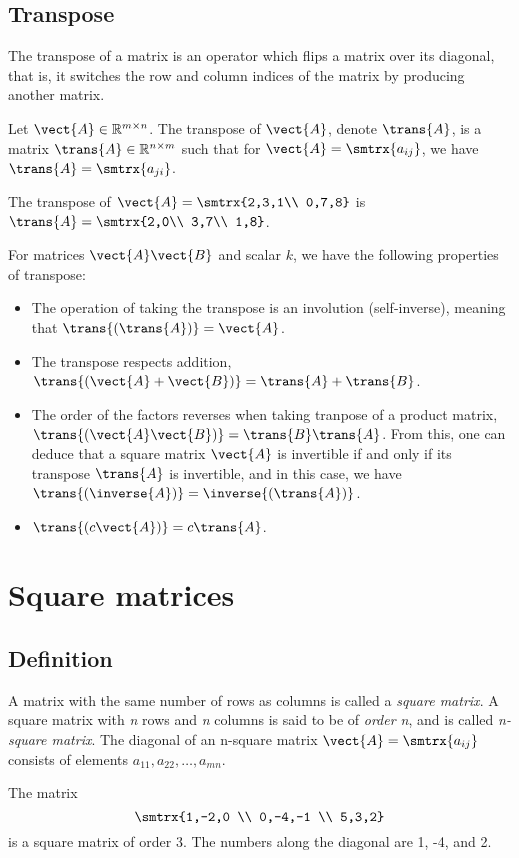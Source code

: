 \subsection{Transpose}
The transpose of a matrix is an operator which flips a matrix over its diagonal, that is, it switches the row and column indices of the matrix by producing another matrix.\par 
Let $\vect{A}\in \mathbb{R}^{m\times n}$. The transpose of $\vect{A}$, denote $\trans{A}$, is a matrix $\trans{A}\in \mathbb{R}^{n\times m}$ such that for $\vect{A}=\smtrx{a_{ij}}$, we have $\trans{A}=\smtrx{a_{ji}}$.\par 
\begin{example}
    The transpose of $\vect{A}=\smtrx{2,3,1\\ 0,7,8}$ is $\trans{A}=\smtrx{2,0\\ 3,7\\ 1,8}$.
\end{example}
For matrices $\vect{A}\vect{B}$ and scalar $k$, we have the following properties of transpose:
\begin{itemize}
\item The operation of taking the transpose is an involution (self-inverse), meaning that $\trans{\left( \trans{A} \right)}=\vect{A}$.
\item The transpose respects addition, $\trans{\left( \vect{A}+\vect{B} \right)}=\trans{A}+\trans{B}$.
\item The order of the factors reverses when taking tranpose of a product matrix, $\trans{ \left(\vect{A}\vect{B}\right) }=\trans{B}\trans{A}$. From this, one can deduce that a square matrix $\vect{A}$ is invertible if and only if its transpose $\trans{A}$ is invertible, and in this case, we have $\trans{\left( \inverse{A} \right)}=\inverse{\left( \trans{A} \right)}$.
\item $\trans{\left( c\vect{A} \right)}=c\trans{A}$.
\end{itemize}

\section{Square matrices}
\subsection{Definition}
A matrix with the same number of rows as columns is called a \emph{square matrix}. A square matrix with \emph{n} rows and \emph{n} columns is said to be of \emph{order n}, and is called \emph{n-square matrix}. The diagonal of an n-square matrix $\vect{A}=\smtrx{a_{ij}}$ consists of elements $a_{11},a_{22},\ldots , a_{mn}$.
\begin{example}
The matrix \[ \smtrx{1,-2,0 \\ 0,-4,-1 \\ 5,3,2} \] is a square matrix of order 3. The numbers along the diagonal are 1, -4, and 2.
\end{example}
